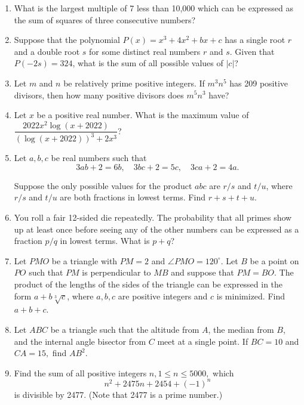 \documentclass[11pt,paper=letter]{scrartcl}
\begin{document}
   \begin{enumerate}[resume, label=\arabic*.,font=\bfseries]
    
    \item What is the largest multiple of 7 less than 10,000 which can be expressed as the sum of squares of three consecutive numbers?
    
    \item Suppose that the polynomial $P(x) = x^3 + 4x^2 + bx +c$ has a single root $r$ and a double root $s$ for some distinct real numbers $r$ and $s$. Given that $P(-2s) = 324$, what is the sum of all possible values of $|c|$?
    
    \item Let $m$ and $n$ be relatively prime positive integers. If $m^3n^5$ has 209 positive divisors, then how many positive divisors does $m^5n^3$ have?
    
    \item Let $x$ be a positive real number. What is the maximum value of $\dfrac{2022x^2 \log(x+2022)}{\left(\log(x+2022)\right)^3 + 2x^3}$?
    
    \item Let $a,b,c$ be real numbers such that $$3ab + 2 = 6b, \quad 3bc + 2 = 5c, \quad 3ca + 2 =4a.$$
    
   Suppose the only possible values for the product $abc$ are $r/s$ and $t/u$, where $r/s$ and $t/u$ are both fractions in lowest terms. Find $r+s+t+u.$
    
    \item You roll a fair 12-sided die repeatedly. The probability that all primes show up at least once before seeing any of the other numbers can be expressed as a fraction $p/q$ in lowest terms. What is $p+q$?
    
    \item Let $PMO$ be a triangle with $PM =2$ and $\angle PMO = 120^{\circ}$. Let $B$ be a point on $PO$ such that $PM$ is perpendicular to $MB$ and suppose that $PM=BO$. The product of the lengths of the sides of the triangle can be expressed in the form $a + b\sqrt[3]{c}$, where $a,b,c$ are positive integers and $c$ is minimized. Find $a+b+c$.
    
    \item Let $ABC$ be a triangle such that the altitude from $A$, the median from $B$, and the internal angle bisector from $C$ meet at a single point. If $BC = 10$ and $CA = 15,$ find $AB^2.$
    
    \item Find the sum of all positive integers $n, 1 \leq n \leq 5000,$ which $$n^2 +2475n +2454 + (-1)^n$$is divisible by 2477. (Note that 2477 is a prime number.)
    

\end{enumerate}
\end{document}
